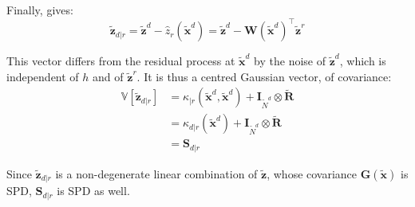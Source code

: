 Finally,  gives:
\begin{equation}
	\tilde{\mathbf{z}}_{d|r}=\tilde{\mathbf{z}}^d-\hat{z}_r(\tilde{\mathbf{x}}^d)=\tilde{\mathbf{z}}^d-\mathbf{W}(\tilde{\mathbf{x}}^d)^\top\tilde{\mathbf{z}}^r
\end{equation}

This vector differs from the residual process at $\tilde{\mathbf{x}}^d$ by the noise of $\tilde{\mathbf{z}}^d$, which is independent of $h$ and of $\tilde{\mathbf{z}}^r$. It is thus a centred Gaussian vector, of covariance:
\begin{equation}
	\begin{aligned}
	\mathbb{V}\left[\tilde{\mathbf{z}}_{d|r}\right]&=\kappa_{|r}(\tilde{\mathbf{x}}^d,\tilde{\mathbf{x}}^d)+\mathbf{I}_{\tilde{N}^d}\otimes\tilde{\mathbf{R}}\\
	&=\kappa_{d|r}(\tilde{\mathbf{x}}^d)+\mathbf{I}_{\tilde{N}^d}\otimes\tilde{\mathbf{R}}\\
	&=\mathbf{S}_{d|r}
	\end{aligned}
\end{equation}

Since $\tilde{\mathbf{z}}_{d|r}$ is a non-degenerate linear combination of $\tilde{\mathbf{z}}$, whose covariance $\mathbf{G}(\tilde{\mathbf{x}})$ is SPD, $\mathbf{S}_{d|r}$ is SPD as well.

